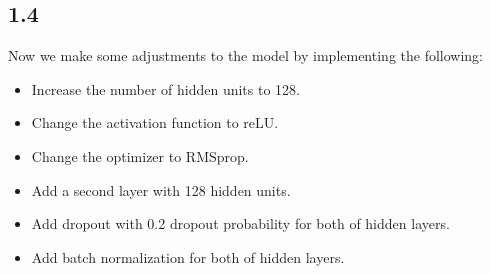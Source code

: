 \documentclass[10pt, a4paper, english]{article}\usepackage[]{graphicx}\usepackage[dvipsnames]{xcolor}
\begin{document}
\subsection{1.4}
Now we make some adjustments to the model by implementing the following:
\begin{itemize}
\item Increase the number of hidden units to 128.
\item Change the activation function to reLU. 
\item Change the optimizer to RMSprop. 
\item Add a second layer with 128 hidden units. 
\item Add dropout with 0.2 dropout probability for both of  hidden layers. 
\item Add batch normalization for both of hidden layers.
\end{itemize}
\end{document}
